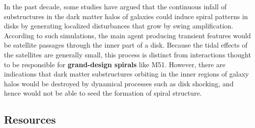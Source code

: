 \documentclass[a4paper,10pt]{article}
\begin{document}
{\noindent}In the past decade, some studies have argued that the continuous infall of substructures in the dark matter halos of galaxies could induce spiral patterns in disks by generating localized disturbances that grow by swing amplification. According to such simulations, the main agent producing transient features would be satellite passages through the inner part of a disk. Because the tidal effects of the satellites are generally small, this process is distinct from interactions thought to be responsible for \textbf{grand-design spirals} like M51. However, there are indications that dark matter substructures orbiting in the inner regions of galaxy halos would be destroyed by dynamical processes such as disk shocking, and hence would not be able to seed the formation of spiral structure.


\newpage
\subsection{Resources}
\end{document}
